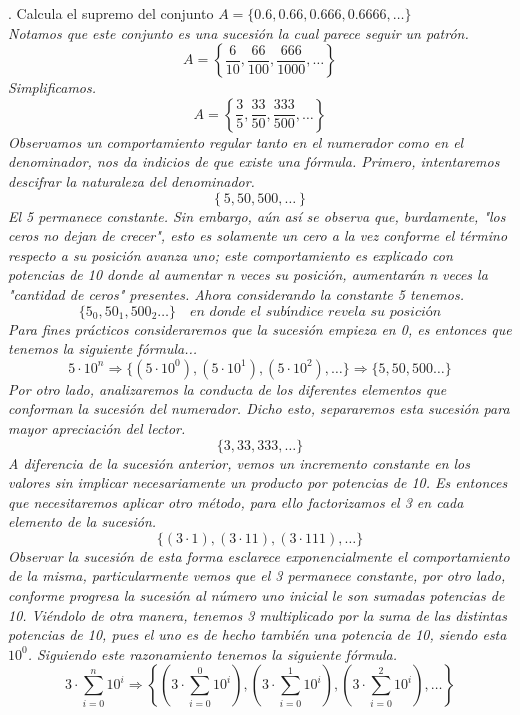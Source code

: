 \documentclass{article}
\begin{document}
  . Calcula el supremo del conjunto \(A=\{0.6,0.66,0.666,0.6666,\ldots\}\) \\
\textit{Notamos que este conjunto es una sucesión la cual parece seguir un patrón.}\\
\[A=\left\{\frac{6}{10}, \frac{66}{100}, \frac{666}{1000}, \ldots\right\}\]
\textit{Simplificamos.}
\[A=\left\{\frac{3}{5}, \frac{33}{50}, \frac{333}{500}, \ldots\right\}\]
\textit{Observamos un comportamiento regular tanto en el numerador como en el denominador, nos da indicios de que existe una fórmula. Primero, intentaremos descifrar la naturaleza del denominador.}\\
\[ \left\{5, 50, 500, \ldots\right\} \]
\textit{El 5 permanece constante. Sin embargo, aún así se observa que, burdamente, "los ceros no dejan de crecer", esto es solamente un cero a la vez conforme el término respecto a su posición avanza uno; este comportamiento es explicado con potencias de 10 donde al aumentar n veces su posición, aumentarán n veces la "cantidad de ceros" presentes. Ahora considerando la constante 5 tenemos.}
\[ \{ 5_0, 50_1, 500_2 \ldots \} \quad \textit{en donde el subíndice revela su posición} \]
\textit{Para fines prácticos consideraremos que la sucesión empieza en 0, es entonces que tenemos la siguiente fórmula...}
\[ 5 \cdot 10^n \Rightarrow \{ (5 \cdot 10^0), (5 \cdot 10^1), (5 \cdot 10^2), \ldots \} \Rightarrow \{  5, 50, 500 \ldots \} \]
\textit{Por otro lado, analizaremos la conducta de los diferentes elementos que conforman la sucesión del numerador. Dicho esto, separaremos esta sucesión para mayor apreciación del lector.}
\[ \{ 3, 33, 333, \ldots \} \]
\textit{A diferencia de la sucesión anterior, vemos un incremento constante en los valores sin implicar necesariamente un producto por potencias de 10. Es entonces que necesitaremos aplicar otro método, para ello factorizamos el 3 en cada elemento de la sucesión.}
\[ \{ (3\cdot1), (3\cdot11), (3\cdot111), \ldots \} \]
\textit{Observar la sucesión de esta forma esclarece exponencialmente el comportamiento de la misma, particularmente vemos que el 3 permanece constante, por otro lado, conforme progresa la sucesión al número uno inicial le son sumadas potencias de 10. Viéndolo de otra manera, tenemos 3 multiplicado por la suma de las distintas potencias de 10, pues el uno es de hecho también una potencia de 10, siendo esta \(10^0\). Siguiendo este razonamiento tenemos la siguiente fórmula.}
\[ 3 \cdot \sum_{i=0}^n 10^i \Rightarrow \left\{\left(3 \cdot \sum_{i=0}^0 10^i\right), \left(3 \cdot \sum_{i=0}^1 10^i\right), \left(3 \cdot \sum_{i=0}^2 10^i\right), \ldots \right\} \]
\end{document}
